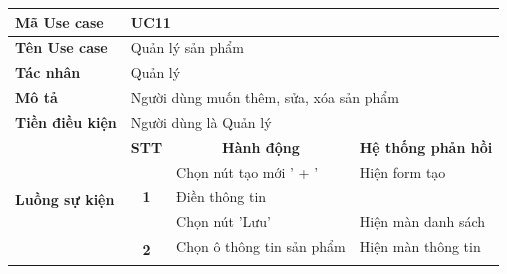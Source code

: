 \documentclass[../DoAn.tex]{subfiles}
\begin{document}
\begin{table}[H]
    \begin{tabular}{|l|c|l|l|}
        \hline
        \textbf{Mã Use case}                    & \multicolumn{3}{l|}{UC11}                                                                                                                                  \\ \hline
        \textbf{Tên Use case}                   & \multicolumn{3}{l|}{Quản lý sản phẩm}                                                                                                                      \\ \hline
        \textbf{Tác nhân}                       & \multicolumn{3}{l|}{Quản lý}                                                                                                                               \\ \hline
        \textbf{Mô tả}                          & \multicolumn{3}{l|}{Người dùng muốn thêm, sửa, xóa sản phẩm}                                                                                               \\ \hline
        \textbf{Tiền điều kiện}                 & \multicolumn{3}{l|}{Người dùng là Quản lý}                                                                                                                 \\ \hline
        \multirow{9}{*}{\textbf{Luồng sự kiện}} & \multicolumn{1}{c|}{\textbf{STT}}                            & \multicolumn{1}{c|}{\textbf{Hành động}}   & \multicolumn{1}{c|}{\textbf{Hệ thống phản hồi}} \\ \cline{2-4}
                                                & \multirow{3}{*}{\textbf{1}}                                  & Chọn nút tạo mới ' + '                    & Hiện form tạo                                   \\ \cline{3-4}
                                                &                                                              & Điền thông tin                            &                                                 \\
                                                &                                                              & Chọn nút 'Lưu'                            & Hiện màn danh sách                              \\ \cline{2-4}
                                                & \multirow{4}{*}{\textbf{2}}                                  & Chọn ô thông tin sản phẩm                 & Hiện màn thông tin                              \\ \cline{3-4}

\end{tabular}
\end{table}
\end{document}
